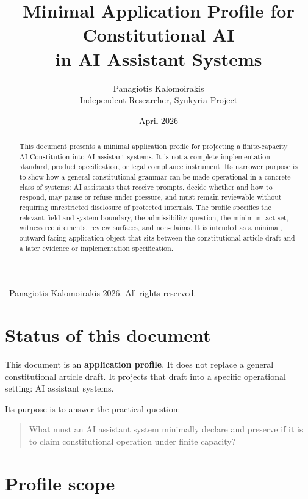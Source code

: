 \documentclass[11pt]{article}
\title{Minimal Application Profile for Constitutional AI\\
in AI Assistant Systems}
\author{Panagiotis Kalomoirakis\\
Independent Researcher, Synkyria Project}
\date{April 2026}
\begin{document}
\maketitle

\maketitle

\begin{center}
\small \textcopyright\ Panagiotis Kalomoirakis 2026. All rights reserved.
\end{center}

\begin{abstract}
This document presents a minimal application profile for projecting a finite-capacity AI Constitution into AI assistant systems. It is not a complete implementation standard, product specification, or legal compliance instrument. Its narrower purpose is to show how a general constitutional grammar can be made operational in a concrete class of systems: AI assistants that receive prompts, decide whether and how to respond, may pause or refuse under pressure, and must remain reviewable without requiring unrestricted disclosure of protected internals. The profile specifies the relevant field and system boundary, the admissibility question, the minimum act set, witness requirements, review surfaces, and non-claims. It is intended as a minimal, outward-facing application object that sits between the constitutional article draft and a later evidence or implementation specification.
\end{abstract}

\section{Status of this document}

This document is an \textbf{application profile}. It does not replace a general constitutional article draft. It projects that draft into a specific operational setting: AI assistant systems.

Its purpose is to answer the practical question:

\begin{quote}
What must an AI assistant system minimally declare and preserve if it is to claim constitutional operation under finite capacity?
\end{quote}

\section{Profile scope}
\end{document}
